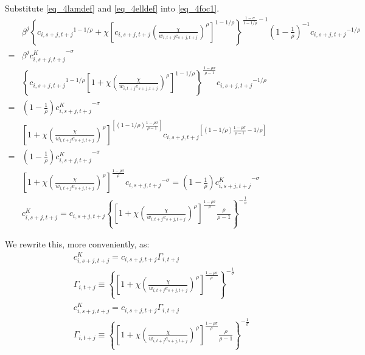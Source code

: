 \documentclass[letterpaper,12pt]{article}
\theoremstyle{definition}
\numberwithin{equation}{section}
\begin{document}
\begin{spacing}{1.5}
	Substitute \eqref{eq_4lamdef} and \eqref{eq_4elldef} into \eqref{eq_4foc1}.
	\begin{align}
		& \beta^j \left\{ {c_{i,s+j,t+j}}^{1-1/\rho} + \chi \left[c_{i,s+j,t+j} \left(\frac{\chi}{w_{i,t+j} e_{s+j,t+j}}\right)^\rho\right]^{1-1/\rho}\right\}^{\tfrac{{1-\sigma}}{1-1/\rho}-1} \left(1-\tfrac{1}{\rho}\right)^{-1} {c_{i,s+j,t+j}}^{-1/\rho}  \nonumber \\ = &  \beta^j {c^K_{i,s+j,t+j}}^{-\sigma} \nonumber \\
		& \left\{ {c_{i,s+j,t+j}}^{1-1/\rho} \left[1 + \chi \left(\frac{\chi}{w_{i,t+j} e_{s+j,t+j}}\right)^\rho\right]^{1-1/\rho}\right\}^{\tfrac{1-\rho \sigma}{\rho-1}}  {c_{i,s+j,t+j}}^{-1/\rho}  \nonumber \\ = &  \left(1-\tfrac{1}{\rho}\right) {c^K_{i,s+j,t+j}}^{-\sigma} \nonumber \\
		& \left[1 + \chi \left(\frac{\chi}{w_{i,t+j} e_{s+j,t+j}}\right)^\rho\right]^{\left[(1-1/\rho)
		\tfrac{1-\rho \sigma}{\rho-1}\right]}  {c_{i,s+j,t+j}}^{\left[(1-1/\rho) \tfrac{1-\rho\sigma}{\rho-1}-1/\rho\right]}  \nonumber \\ = &  \left(1-\tfrac{1}{\rho}\right) {c^K_{i,s+j,t+j}}^{-\sigma} \nonumber \\
		& \left[1 + \chi \left(\frac{\chi}{w_{i,t+j} e_{s+j,t+j}}\right)^\rho\right]^{\tfrac{1-\rho \sigma}{\rho}}  {c_{i,s+j,t+j}}^{-\sigma} = \left(1-\tfrac{1}{\rho}\right) {c^K_{i,s+j,t+j}}^{-\sigma} \nonumber \\
		& c^K_{i,s+j,t+j} = c_{i,s+j,t+j} \left\{ \left[1 + \chi \left(\frac{\chi}{w_{i,t+j} e_{s+j,t+j}}\right)^\rho\right]^{\tfrac{1-\rho \sigma}{\rho}} \frac{\rho}{\rho-1} \right\}^{-\tfrac{1}{\sigma}} \nonumber
	\end{align}

	We rewrite this, more conveniently, as:
	\begin{align}
       & c^K_{i,s+j,t+j} = c_{i,s+j,t+j} \Gamma_{i,t+j} \label{eq_4cKdef} \\
       & \Gamma_{i,t+j} \equiv \left\{ \left[1 + \chi \left(\frac{\chi}{w_{i,t+j} e_{s+j,t+j}}\right)^\rho\right]^{\tfrac{1-\rho \sigma}{\rho}} \right\}^{-\tfrac{1}{\sigma}} \label{eq_4Gamdef} \\
       & c^K_{i,s+j,t+j} = c_{i,s+j,t+j} \Gamma_{i,t+j} \label{eq_3cKdef} \\
       & \Gamma_{i,t+j} \equiv \left\{ \left[1 + \chi \left(\frac{\chi}{w_{i,t+j} e_{s+j,t+j}}\right)^\rho\right]^{\tfrac{1-\rho \sigma}{\rho}} \frac{\rho}{\rho-1} \right\}^{-\tfrac{1}{\sigma}} \label{eq_3Gamdef}
	\end{align}


\end{spacing}
\end{document}
